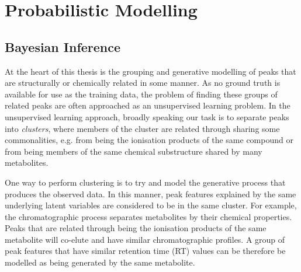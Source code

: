 \chapter{Probabilistic Modelling}
\label{c:ml-background}



\section{Bayesian Inference}

At the heart of this thesis is the grouping and generative modelling of peaks that are structurally or chemically related in some manner. As no ground truth is available for use as the training data, the problem of finding these groups of related peaks are often approached as an unsupervised learning problem. In the unsupervised learning approach, broadly speaking our task is to separate peaks into \emph{clusters}, where members of the cluster are related through sharing some commonalities, e.g. from being the ionisation products of the same compound or from being members of the same chemical substructure shared by many metabolites.

One way to perform clustering is to try and model the generative process that produces the observed data. In this manner, peak features explained by the same underlying latent variables are considered to be in the same cluster. For example, the chromatographic process separates metabolites by their chemical properties. Peaks that are related through being the ionisation products of the same metabolite will co-elute and have similar chromatographic profiles. A group of peak features that have similar retention time (RT) values can be therefore be modelled as being generated by the same metabolite. 


